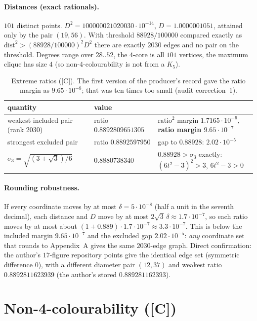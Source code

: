 \documentclass[10pt]{article}
\newcommand{\tier}[1]{\textsf{[#1]}}
\newcommand{\tC}{\tier{C}}
\begin{document}
\paragraph{Distances (exact rationals).} $101$ distinct points. $D^2=100000021020030\cdot10^{-14}$, $D=1.0000001051$, attained only by the pair $(19,56)$. With threshold $88928/100000$ compared exactly as $\mathrm{dist}^2>(88928/100000)^2D^2$ there are exactly $2030$ edges and no pair on the threshold. Degrees range over $28..52$, the $4$-core is all $101$ vertices, the maximum clique has size $4$ (so non-$4$-colourability is not from a $K_5$).
\begin{table}[h]\centering\small
\begin{tabular}{@{}lll@{}}\toprule
quantity & value & \\ \midrule
weakest included pair (rank $2030$) & ratio $0.8892809651305$ & $\mathrm{ratio}^2$ margin $1.7165\cdot10^{-6}$, \textbf{ratio margin $9.65\cdot10^{-7}$}\\
strongest excluded pair & ratio $0.8892597950$ & gap to $0.88928$: $2.02\cdot10^{-5}$\\
$\sigma_3=\sqrt{(3+\sqrt3)/6}$ & $0.8880738340$ & $0.88928>\sigma_3$ exactly: $(6t^2-3)^2>3$, $6t^2-3>0$\\ \bottomrule
\end{tabular}
\caption{Extreme ratios (\tC{}). The first version of the producer's record gave the ratio margin as $9.65\cdot10^{-8}$; that was ten times too small (audit correction~1).}\label{tab:marg}
\end{table}
\paragraph{Rounding robustness.} If every coordinate moves by at most $\delta=5\cdot10^{-8}$ (half a unit in the seventh decimal), each distance and $D$ move by at most $2\sqrt3\,\delta\approx1.7\cdot10^{-7}$, so each ratio moves by at most about $(1+0.889)\cdot1.7\cdot10^{-7}\approx3.3\cdot10^{-7}$. This is below the included margin $9.65\cdot10^{-7}$ and the excluded gap $2.02\cdot10^{-5}$: \emph{any} coordinate set that rounds to Appendix~A gives the same $2030$-edge graph. Direct confirmation: the author's $17$-figure repository points give the identical edge set (symmetric difference $0$), with a different diameter pair $(12,37)$ and weakest ratio $0.8892811623939$ (the author's stored $0.889281162393$).

\section{Non-4-colourability (\tC{})}\label{sec:sat}
\end{document}
